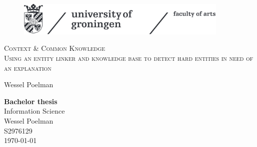 \documentclass[
10pt, %
a4paper, %
oneside, %
headinclude,footinclude, %
] {book}%
\title{\normalfont\spacedallcaps{title}} %
\author{\spacedlowsmallcaps{author}} %
\date{} %
\begin{document}


\pagestyle{scrheadings} %



\hypersetup{pageanchor=false}
\begin{titlepage}
\thispagestyle{empty}
\begin{figure}[h!] %
  \includegraphics[width=4in]{ruglogo}
\end{figure}

\begin{center}
\vspace{30 mm}
\begingroup \linespread{1,75} \selectfont
\textsc{\LARGE Context \& Common Knowledge}\\
\textsc{\Large Using an entity linker and knowledge base to detect hard entities in need of an explanation}\\[1,5cm]
\endgroup

Wessel Poelman\\[2,5cm]

\end{center}
\vfill
\textbf{Bachelor thesis}\\
Information Science\\
Wessel Poelman\\
S2976129\\
\today
\end{titlepage}
\hypersetup{pageanchor=true}
\end{document}
